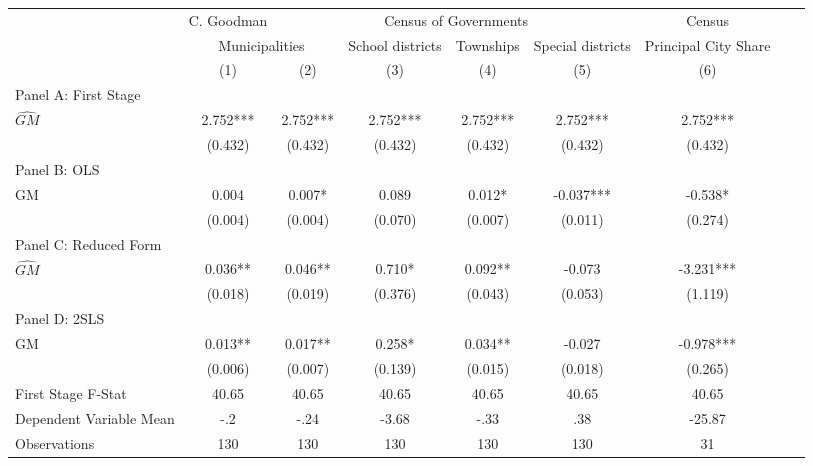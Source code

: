  \begin{tabular}{l*{8}{c}} \toprule
&\multicolumn{1}{c}{C. Goodman}&\multicolumn{4}{c}{Census of Governments}&\multicolumn{1}{c}{Census}\\\cmidrule(lr){2-2}\cmidrule(lr){3-6}\cmidrule(lr){7-7}
&\multicolumn{2}{c}{Municipalities}&\multicolumn{1}{c}{School districts}&\multicolumn{1}{c}{Townships}&\multicolumn{1}{c}{Special districts}&\multicolumn{1}{c}{Principal City Share}\\\cmidrule(lr){2-3}\cmidrule(lr){4-6}\cmidrule(lr){7-7}
&\multicolumn{1}{c}{(1)}&\multicolumn{1}{c}{(2)}&\multicolumn{1}{c}{(3)}&\multicolumn{1}{c}{(4)}&\multicolumn{1}{c}{(5)}&\multicolumn{1}{c}{(6)}\\
\cmidrule(lr){1-7}
\multicolumn{6}{l}{Panel A: First Stage}\\
\cmidrule(lr){1-7}
$\widehat{GM}$  &    2.752***&    2.752***&    2.752***&    2.752***&    2.752***&    2.752***\\
                &  (0.432)   &  (0.432)   &  (0.432)   &  (0.432)   &  (0.432)   &  (0.432)   \\
\cmidrule(lr){1-7}
\multicolumn{6}{l}{Panel B: OLS}\\
\cmidrule(lr){1-7}
GM              &    0.004   &    0.007*  &    0.089   &    0.012*  &   -0.037***&   -0.538*  \\
                &  (0.004)   &  (0.004)   &  (0.070)   &  (0.007)   &  (0.011)   &  (0.274)   \\
\cmidrule(lr){1-7}
\multicolumn{6}{l}{Panel C: Reduced Form}\\
\cmidrule(lr){1-7}
$\widehat{GM}$  &    0.036** &    0.046** &    0.710*  &    0.092** &   -0.073   &   -3.231***\\
                &  (0.018)   &  (0.019)   &  (0.376)   &  (0.043)   &  (0.053)   &  (1.119)   \\
\cmidrule(lr){1-7}
\multicolumn{6}{l}{Panel D: 2SLS}\\
\cmidrule(lr){1-7}
GM              &    0.013** &    0.017** &    0.258*  &    0.034** &   -0.027   &   -0.978***\\
                &  (0.006)   &  (0.007)   &  (0.139)   &  (0.015)   &  (0.018)   &  (0.265)   \\
\midrule
First Stage F-Stat&    40.65   &    40.65   &    40.65   &    40.65   &    40.65   &    40.65   \\
Dependent Variable Mean&      -.2   &     -.24   &    -3.68   &     -.33   &      .38   &   -25.87   \\
Observations    &      130   &      130   &      130   &      130   &      130   &       31   \\
       \bottomrule \end{tabular}
